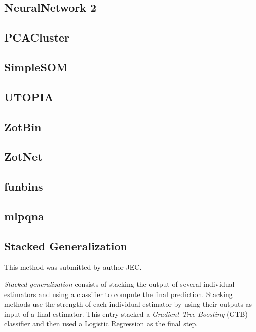 \documentclass[twocolumn,twocolappendix]{aastex63}
\begin{document}
\subsection{ {\sc NeuralNetwork 2} }


\subsection{ {\sc PCACluster} }


\subsection{ {\sc SimpleSOM} }


\subsection{ {\sc UTOPIA} }


\subsection{ {\sc ZotBin} }


\subsection{ {\sc ZotNet} }


\subsection{ {\sc funbins} }


\subsection{ {\sc mlpqna} }


\subsection{ {\sc Stacked Generalization} }
This method was submitted by author JEC.

\emph{Stacked generalization} consists of stacking the output of several individual estimators and 
using a classifier to compute the final prediction. Stacking methods use the strength of each 
individual estimator by using their outputs as input of a final estimator.  This entry stacked
a \emph{Gradient Tree Boosting} (GTB) classifier and then used a Logistic Regression as the final step.
\end{document}
